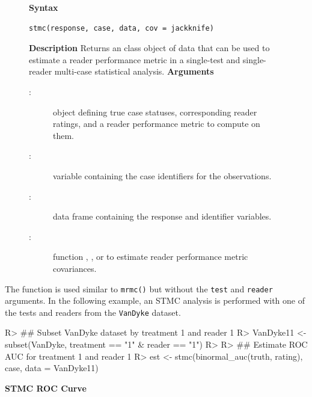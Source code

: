 \documentclass[
]{jss}
\newenvironment{Description}{\textbf{Description}\vspace{0.5em}\newline}{\vspace{0.5em}\newline}
\begin{document}
\begin{figure}[h]
\begin{tcolorbox}[title=STMC Function]
\textbf{Syntax}
\begin{verbatim}
stmc(response, case, data, cov = jackknife)
\end{verbatim}
\begin{Description}
Returns an  class object of data that can be used to estimate a reader performance metric in a single-test and single-reader multi-case statistical analysis.
\end{Description}
\textbf{Arguments}
\begin{description}
\item[:] object defining true case statuses, corresponding reader ratings, and a reader performance metric to compute on them.
\item[:] variable containing the case identifiers for the  observations.
\item[:] data frame containing the response and identifier variables.
\item[:] function , , or  to estimate reader performance metric covariances.
\end{description}
\end{tcolorbox}
\end{figure}

The function is used similar to \texttt{mrmc()} but without the
\texttt{test} and \texttt{reader} arguments. In the following example,
an STMC analysis is performed with one of the tests and readers from the
\texttt{VanDyke} dataset.

\begin{CodeChunk}
\begin{CodeInput}
R> ## Subset VanDyke dataset by treatment 1 and reader 1
R> VanDyke11 <- subset(VanDyke, treatment == "1" & reader == "1")
R> 
R> ## Estimate ROC AUC for treatment 1 and reader 1
R> est <- stmc(binormal_auc(truth, rating), case, data = VanDyke11)
\end{CodeInput}
\end{CodeChunk}

\textbf{STMC ROC Curve}
\end{document}
